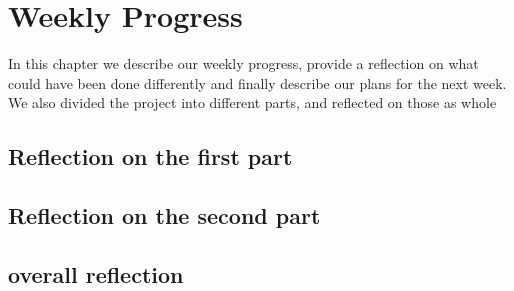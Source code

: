 \chapter{Weekly Progress}
In this chapter we describe our weekly progress, provide a reflection on what
could have been done differently and finally describe our plans for the next
week. We also divided the project into different parts, and reflected on those
as whole








\section{Reflection on the first part}






\section{Reflection on the second part}









\section{overall reflection}
